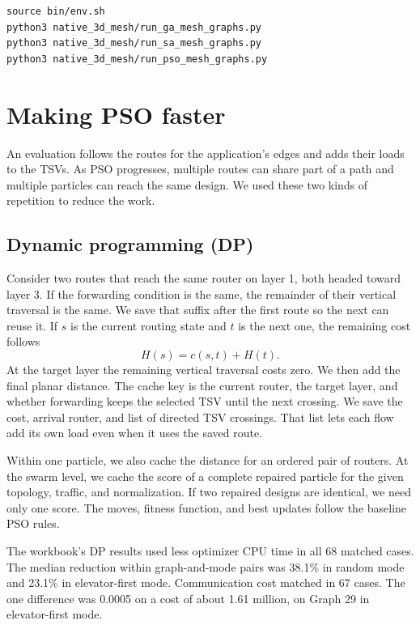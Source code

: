 \documentclass[12pt,a4paper]{article}
\begin{document}
{\small
\begin{verbatim}
source bin/env.sh
python3 native_3d_mesh/run_ga_mesh_graphs.py
python3 native_3d_mesh/run_sa_mesh_graphs.py
python3 native_3d_mesh/run_pso_mesh_graphs.py
\end{verbatim}
}

\clearpage
\section{Making PSO faster}

An evaluation follows the routes for the application's edges and adds their loads to the TSVs. As PSO progresses, multiple routes can share part of a path and multiple particles can reach the same design. We used these two kinds of repetition to reduce the work.

\subsection{Dynamic programming (DP)}

Consider two routes that reach the same router on layer 1, both headed toward layer 3. If the forwarding condition is the same, the remainder of their vertical traversal is the same. We save that suffix after the first route so the next can reuse it. If \(s\) is the current routing state and \(t\) is the next one, the remaining cost follows
\[
H(s)=c(s,t)+H(t).
\]
At the target layer the remaining vertical traversal costs zero. We then add the final planar distance. The cache key is the current router, the target layer, and whether forwarding keeps the selected TSV until the next crossing. We save the cost, arrival router, and list of directed TSV crossings. That list lets each flow add its own load even when it uses the saved route.

Within one particle, we also cache the distance for an ordered pair of routers. At the swarm level, we cache the score of a complete repaired particle for the given topology, traffic, and normalization. If two repaired designs are identical, we need only one score. The moves, fitness function, and best updates follow the baseline PSO rules.

The workbook's DP results used less optimizer CPU time in all 68 matched cases. The median reduction within graph-and-mode pairs was 38.1\% in random mode and 23.1\% in elevator-first mode. Communication cost matched in 67 cases. The one difference was 0.0005 on a cost of about 1.61 million, on Graph 29 in elevator-first mode.
\end{document}
